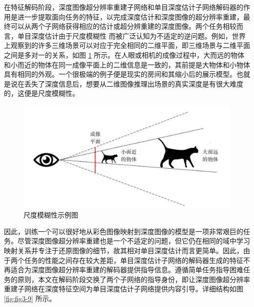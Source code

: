 在特征解码阶段，深度图像超分辨率重建子网络和单目深度估计子网络解码器的作用是进一步提取面向任务的特征，以完成深度估计和深度图像的超分辨率重建，最终可以从两个子网络获得相应的估计或超分辨重建的深度图像。两个任务相较而言，单目深度估计由于尺度模糊性 \cite{DBLP:conf/nips/EigenPF14} 而被广泛认知为不适定的逆问题。例如，世界上观察到的许多三维场景可以对应于完全相同的二维平面，即三维场景与二维平面之间是多对一的关系，如图 \ref{fig:fig3-8} 所示。在人眼或相机的成像过程中，大而远的物体和小而近的物体在同一成像平面上的二维信息是一致的，其前提是大物体和小物体具有相同的外观。一个很极端的例子便是现实的房间和其缩小后的展示模型。也就是说在丢失了深度信息后，想要从二维图像推理出场景的真实深度是有很大难度的，这便是尺度模糊性。

\begin{figure}[!htbp]
	\centering
	\includegraphics{figures/25.png}
	\caption{尺度模糊性示例图}
	\label{fig:fig3-8}
\end{figure}

因此，训练一个可以很好地从彩色图像映射到深度图像的模型是一项非常艰巨的任务。尽管深度图像超分辨率重建也是一个不适定的问题，但它仍在相同的域中学习映射关系并专注于还原图像的细节，故其相对单目深度估计而言更简单。因此，由于两个任务的性能之间存在较大差距，单目深度估计子网络的解码器生成的特征不再适合为深度图像超分辨率重建的解码器提供指导信息。遵循简单任务指导困难任务的原则，本文在解码阶段交换了两个子网络的指导身份，即让深度图像超分辨率重建子网络在深度特征空间为单目深度估计子网络提供内容引导。详细结构如图 \ref{fig:fig3-9} 所示。

